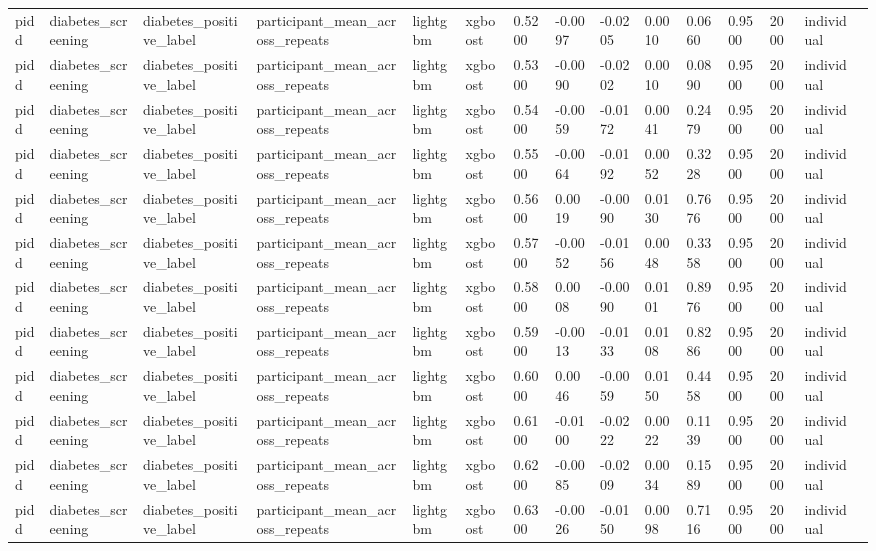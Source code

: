 \begin{tabular}{lllllllllllllll}
pidd & diabetes\_screening & diabetes\_positive\_label & participant\_mean\_across\_repeats & lightgbm & xgboost & 0.5200 & -0.0097 & -0.0205 & 0.0010 & 0.0660 & 0.9500 & 2000 & individual &  \\
pidd & diabetes\_screening & diabetes\_positive\_label & participant\_mean\_across\_repeats & lightgbm & xgboost & 0.5300 & -0.0090 & -0.0202 & 0.0010 & 0.0890 & 0.9500 & 2000 & individual &  \\
pidd & diabetes\_screening & diabetes\_positive\_label & participant\_mean\_across\_repeats & lightgbm & xgboost & 0.5400 & -0.0059 & -0.0172 & 0.0041 & 0.2479 & 0.9500 & 2000 & individual &  \\
pidd & diabetes\_screening & diabetes\_positive\_label & participant\_mean\_across\_repeats & lightgbm & xgboost & 0.5500 & -0.0064 & -0.0192 & 0.0052 & 0.3228 & 0.9500 & 2000 & individual &  \\
pidd & diabetes\_screening & diabetes\_positive\_label & participant\_mean\_across\_repeats & lightgbm & xgboost & 0.5600 & 0.0019 & -0.0090 & 0.0130 & 0.7676 & 0.9500 & 2000 & individual &  \\
pidd & diabetes\_screening & diabetes\_positive\_label & participant\_mean\_across\_repeats & lightgbm & xgboost & 0.5700 & -0.0052 & -0.0156 & 0.0048 & 0.3358 & 0.9500 & 2000 & individual &  \\
pidd & diabetes\_screening & diabetes\_positive\_label & participant\_mean\_across\_repeats & lightgbm & xgboost & 0.5800 & 0.0008 & -0.0090 & 0.0101 & 0.8976 & 0.9500 & 2000 & individual &  \\
pidd & diabetes\_screening & diabetes\_positive\_label & participant\_mean\_across\_repeats & lightgbm & xgboost & 0.5900 & -0.0013 & -0.0133 & 0.0108 & 0.8286 & 0.9500 & 2000 & individual &  \\
pidd & diabetes\_screening & diabetes\_positive\_label & participant\_mean\_across\_repeats & lightgbm & xgboost & 0.6000 & 0.0046 & -0.0059 & 0.0150 & 0.4458 & 0.9500 & 2000 & individual &  \\
pidd & diabetes\_screening & diabetes\_positive\_label & participant\_mean\_across\_repeats & lightgbm & xgboost & 0.6100 & -0.0100 & -0.0222 & 0.0022 & 0.1139 & 0.9500 & 2000 & individual &  \\
pidd & diabetes\_screening & diabetes\_positive\_label & participant\_mean\_across\_repeats & lightgbm & xgboost & 0.6200 & -0.0085 & -0.0209 & 0.0034 & 0.1589 & 0.9500 & 2000 & individual &  \\
pidd & diabetes\_screening & diabetes\_positive\_label & participant\_mean\_across\_repeats & lightgbm & xgboost & 0.6300 & -0.0026 & -0.0150 & 0.0098 & 0.7116 & 0.9500 & 2000 & individual &  \\

\end{tabular}
